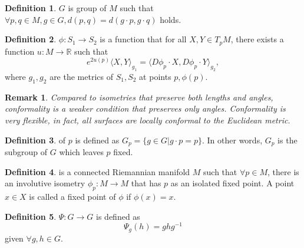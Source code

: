 \documentclass[a4paper]{article}
\theoremstyle{definition}
\newtheorem{definition}{Definition}
\theoremstyle{plain}
\newtheorem{remark}{Remark}
\begin{document}
\begin{definition}
 $G$ is group of $M$ such that $\forall p,q\in M, g\in G, d(p,q)=d(g\cdot p,g\cdot q)$ holds.
\end{definition}

\begin{definition}
 $\phi:S_1\rightarrow S_2$ is a function that for all $X,Y\in T_pM$, there exists a function $u:M\rightarrow\mathbb{R}$ such that
\begin{equation*}
    e^{2u(p)}\langle X,Y\rangle_{g_1}=\langle D\phi_p\cdot X,D\phi_p\cdot Y\rangle_{g_2},
\end{equation*}
where $g_1,g_2$ are the metrics of $S_1, S_2$ at points $p,\phi(p)$.
\end{definition}

\begin{remark}\cite{stanford4}
Compared to isometries that preserve both lengths and angles, conformality is a weaker condition that preserves only angles. Conformality is very flexible, in fact, all surfaces are locally conformal to the Euclidean metric.
\end{remark}

\begin{definition}
 of $p$ is defined as $G_p=\{g\in G|g\cdot p=p\}$. In other words, $G_p$ is the subgroup of $G$ which leaves $p$ fixed.
\end{definition}

\begin{definition}
 is a connected Riemannian manifold $M$ such that $\forall p\in M$, there is an involutive isometry $\phi_p:M\rightarrow M$ that has $p$ as an isolated fixed point. A point $x\in X$ is called a fixed point of $\phi$ if $\phi(x)=x$.
\end{definition}

\begin{definition}
\cite{singh} $\Psi:G\rightarrow G$ is defined as
\begin{equation*}
    \Psi_g(h)=ghg^{-1}
\end{equation*}
given $\forall g,h\in G$.
\end{definition}
\end{document}
